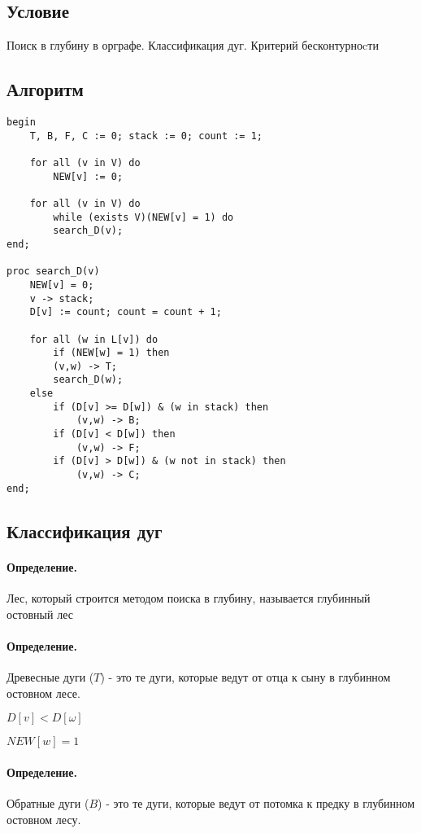 \documentclass{report}
\begin{document}
\subsection{Условие}
Поиск в глубину в орграфе. Классификация дуг. Критерий
бесконтурноcти

\subsection{Алгоритм}

\begin{lstlisting}
begin
    T, B, F, C := 0; stack := 0; count := 1;

    for all (v in V) do
    	NEW[v] := 0;

    for all (v in V) do
    	while (exists V)(NEW[v] = 1) do
	    search_D(v);
end;

proc search_D(v)
    NEW[v] = 0;
    v -> stack;
    D[v] := count; count = count + 1;

    for all (w in L[v]) do
    	if (NEW[w] = 1) then
	    (v,w) -> T;
	    search_D(w);
	else
	    if (D[v] >= D[w]) & (w in stack) then
	    	(v,w) -> B;
	    if (D[v] < D[w]) then
	    	(v,w) -> F;
	    if (D[v] > D[w]) & (w not in stack) then
	        (v,w) -> C;
end;
\end{lstlisting}

\subsection{Классификация дуг}
\paragraph*{Определение.}
Лес, который строится методом поиска в глубину, называется глубинный остовный лес

\paragraph*{Определение.}
Древесные дуги ($T$) - это те дуги, которые ведут от отца к сыну в глубинном остовном лесе.

$D[v] < D[\omega]$

$NEW[w] = 1$

\paragraph*{Определение.}
Обратные дуги ($B$) - это те дуги, которые ведут от потомка к предку в глубинном остовном лесу.
\end{document}
